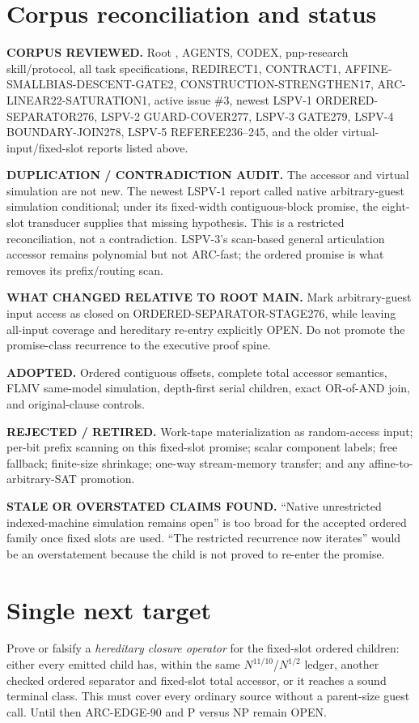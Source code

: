 \documentclass[11pt]{article}
\begin{document}
\section{Corpus reconciliation and status}
\textbf{CORPUS REVIEWED.}  Root , AGENTS, CODEX, pnp-research skill/protocol, all task specifications, REDIRECT1, CONTRACT1, AFFINE-SMALLBIAS-DESCENT-GATE2, CONSTRUCTION-STRENGTHEN17, ARC-LINEAR22-SATURATION1, active issue \#3, newest LSPV-1 ORDERED-SEPARATOR276, LSPV-2 GUARD-COVER277, LSPV-3 GATE279, LSPV-4 BOUNDARY-JOIN278, LSPV-5 REFEREE236--245, and the older virtual-input/fixed-slot reports listed above.

\textbf{DUPLICATION / CONTRADICTION AUDIT.}  The accessor and virtual simulation are not new.  The newest LSPV-1 report called native arbitrary-guest simulation conditional; under its fixed-width contiguous-block promise, the eight-slot transducer supplies that missing hypothesis.  This is a restricted reconciliation, not a contradiction.  LSPV-3's scan-based general articulation accessor remains polynomial but not ARC-fast; the ordered promise is what removes its prefix/routing scan.

\textbf{WHAT CHANGED RELATIVE TO ROOT MAIN.}  Mark arbitrary-guest input access as closed on ORDERED-SEPARATOR-STAGE276, while leaving all-input coverage and hereditary re-entry explicitly OPEN.  Do not promote the promise-class recurrence to the executive proof spine.

\textbf{ADOPTED.}  Ordered contiguous offsets, complete total accessor semantics, FLMV same-model simulation, depth-first serial children, exact OR-of-AND join, and original-clause controls.

\textbf{REJECTED / RETIRED.}  Work-tape materialization as random-access input; per-bit prefix scanning on this fixed-slot promise; scalar component labels; free fallback; finite-size shrinkage; one-way stream-memory transfer; and any affine-to-arbitrary-SAT promotion.

\textbf{STALE OR OVERSTATED CLAIMS FOUND.}  ``Native unrestricted indexed-machine simulation remains open'' is too broad for the accepted ordered family once fixed slots are used.  ``The restricted recurrence now iterates'' would be an overstatement because the child is not proved to re-enter the promise.

\section{Single next target}
Prove or falsify a \emph{hereditary closure operator} for the fixed-slot ordered children: either every emitted child has, within the same $N^{11/10}$/$N^{1/2}$ ledger, another checked ordered separator and fixed-slot total accessor, or it reaches a sound terminal class.  This must cover every ordinary source without a parent-size guest call.  Until then ARC-EDGE-90 and P versus NP remain OPEN.
\end{document}
